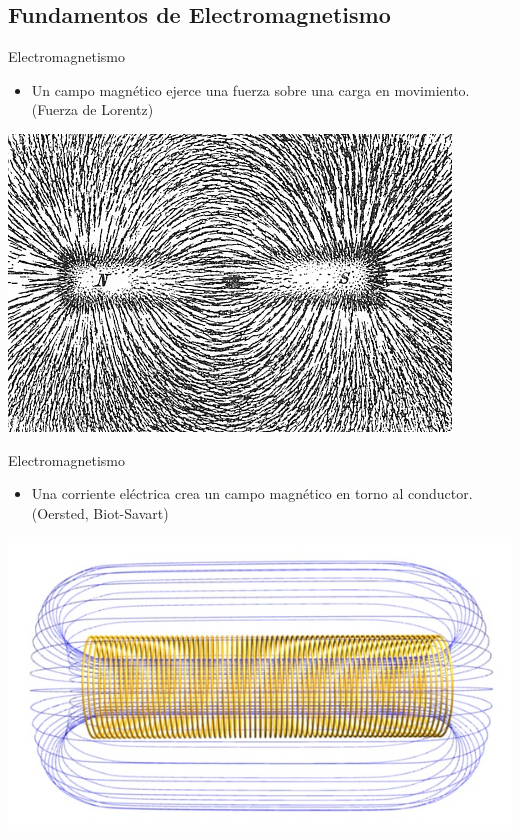 \documentclass[xcolor={usenames,svgnames,dvipsnames}]{beamer}
\begin{document}
\subsection{Fundamentos de Electromagnetismo}
\label{sec:org350aed1}
\begin{frame}[label={sec:org0784476}]{Electromagnetismo}
\begin{itemize}
\item Un campo magnético ejerce una fuerza sobre una carga en movimiento.
(Fuerza de Lorentz)
\end{itemize}

\begin{center}
\includegraphics[width=.9\linewidth]{../figs/Magnet0873.png}
\end{center}
\end{frame}

\begin{frame}[label={sec:org8a77a96}]{Electromagnetismo}
\begin{itemize}
\item Una corriente eléctrica crea un campo magnético en torno al
conductor. (Oersted, Biot-Savart)
\end{itemize}

\begin{center}
\includegraphics[width=.9\linewidth]{../figs/Solenoide.jpg}
\end{center}
\end{frame}
\end{document}
